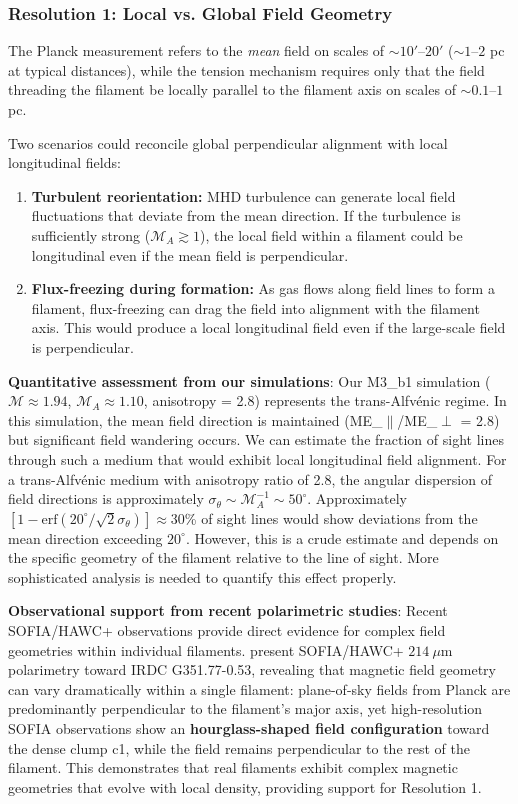 \documentclass[11pt,a4paper]{article}
\begin{document}
\subsubsection{Resolution 1: Local vs. Global Field Geometry}

The Planck measurement refers to the \emph{mean} field on scales of $\sim 10'$--$20'$ ($\sim 1$--$2$ pc at typical distances), while the tension mechanism requires only that the field threading the filament be locally parallel to the filament axis on scales of $\sim 0.1$--$1$ pc.

Two scenarios could reconcile global perpendicular alignment with local longitudinal fields:
\begin{enumerate}
    \item \textbf{Turbulent reorientation:} MHD turbulence can generate local field fluctuations that deviate from the mean direction. If the turbulence is sufficiently strong ($\mathcal{M}_A \gtrsim 1$), the local field within a filament could be longitudinal even if the mean field is perpendicular.
    \item \textbf{Flux-freezing during formation:} As gas flows along field lines to form a filament, flux-freezing can drag the field into alignment with the filament axis. This would produce a local longitudinal field even if the large-scale field is perpendicular.
\end{enumerate}

\textbf{Quantitative assessment from our simulations}: Our M3\_b1 simulation ($\mathcal{M} \approx 1.94$, $\mathcal{M}_A \approx 1.10$, anisotropy = 2.8) represents the trans-Alfv\'enic regime. In this simulation, the mean field direction is maintained (ME\_$\parallel$/ME\_$\perp$ = 2.8) but significant field wandering occurs. We can estimate the fraction of sight lines through such a medium that would exhibit local longitudinal field alignment. For a trans-Alfv\'enic medium with anisotropy ratio of 2.8, the angular dispersion of field directions is approximately $\sigma_\theta \sim \mathcal{M}_A^{-1} \sim 50^\circ$. Approximately $[1 - \text{erf}(20^\circ/\sqrt{2}\sigma_\theta)] \approx 30$\% of sight lines would show deviations from the mean direction exceeding $20^\circ$. However, this is a crude estimate and depends on the specific geometry of the filament relative to the line of sight. More sophisticated analysis is needed to quantify this effect properly.

\textbf{Observational support from recent polarimetric studies}: Recent SOFIA/HAWC+ observations provide direct evidence for complex field geometries within individual filaments. \citet{Jadhav2026} present SOFIA/HAWC+ $214~\mu$m polarimetry toward IRDC G351.77-0.53, revealing that magnetic field geometry can vary dramatically within a single filament: plane-of-sky fields from Planck are predominantly perpendicular to the filament's major axis, yet high-resolution SOFIA observations show an \textbf{hourglass-shaped field configuration} toward the dense clump c1, while the field remains perpendicular to the rest of the filament. This demonstrates that real filaments exhibit complex magnetic geometries that evolve with local density, providing support for Resolution 1.
\end{document}
